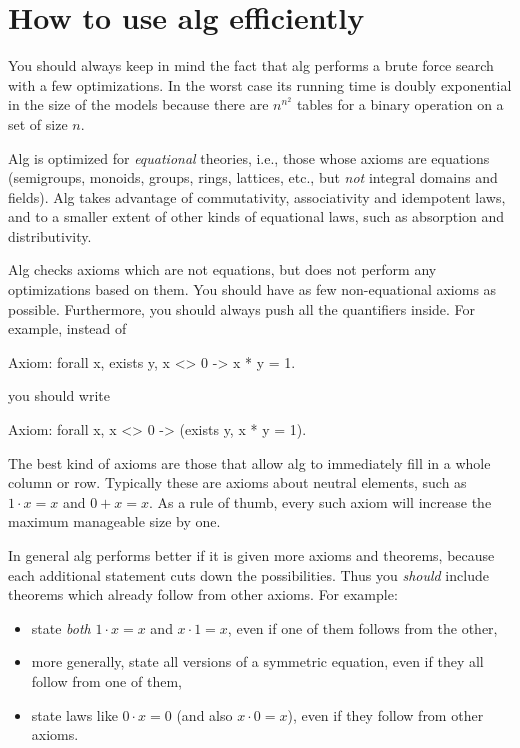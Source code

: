 \documentclass{article}
\begin{document}
\section{How to use alg efficiently}
\label{sec:optimization}

You should always keep in mind the fact that alg performs a brute
force search with a few optimizations. In the worst case its running
time is doubly exponential in the size of the models because there are
$n^{n^2}$ tables for a binary operation on a set of size $n$.

Alg is optimized for \emph{equational} theories, i.e., those whose
axioms are equations (semigroups, monoids, groups, rings, lattices,
etc., but \emph{not} integral domains and fields). Alg takes advantage
of commutativity, associativity and idempotent laws, and to a smaller
extent of other kinds of equational laws, such as absorption and
distributivity.

Alg checks axioms which are not equations, but does not perform any
optimizations based on them. You should have as few non-equational
axioms as possible. Furthermore, you should always push all the
quantifiers inside. For example, instead of
%
\begin{shell}
Axiom: forall x, exists y, x <> 0 -> x * y = 1.
\end{shell}
%
you should write
%
\begin{shell}
Axiom: forall x, x <> 0 -> (exists y, x * y = 1).
\end{shell}
%
The best kind of axioms are those that allow alg to immediately fill in
a whole column or row. Typically these are axioms about neutral
elements, such as $1 \cdot x = x$ and $0 + x = x$. As a rule of thumb,
every such axiom will increase the maximum manageable size by one.

In general alg performs better if it is given more axioms and
theorems, because each additional statement cuts down the
possibilities. Thus you \emph{should} include theorems which already
follow from other axioms. For example:
%
\begin{itemize}
\item state \emph{both} $1 \cdot x = x$ and $x \cdot 1 = x$, even if
  one of them follows from the other,
\item more generally, state all versions of a symmetric equation, even
  if they all follow from one of them,
\item state laws like $0 \cdot x = 0$ (and also $x \cdot 0 = x$), even
  if they follow from other axioms.
\end{itemize}
\end{document}
